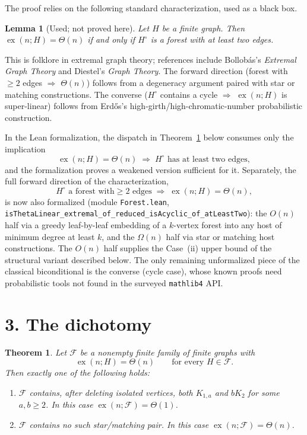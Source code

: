 \documentclass[11pt]{article}
\newtheorem{lemma}{Lemma}
\newtheorem{theorem}{Theorem}
\newcommand{\ex}{\operatorname{ex}}
\begin{document}
The proof relies on the following standard characterization, used as a
black box.

\begin{lemma}[Used; not proved here]
Let \(H\) be a finite graph. Then \(\ex(n;H)=\Theta(n)\) if and only if
\(H^\circ\) is a forest with at least two edges.
\end{lemma}

This is folklore in extremal graph theory; references include
Bollob\'as's \emph{Extremal Graph Theory} and Diestel's \emph{Graph
Theory}. The forward direction (forest with \(\ge 2\) edges \(\Rightarrow\)
\(\Theta(n)\)) follows from a degeneracy argument paired with star or
matching constructions. The converse (\(H^\circ\) contains a cycle
\(\Rightarrow\) \(\ex(n;H)\) is super-linear) follows from
Erd\H{o}s's high-girth/high-chromatic-number probabilistic construction.

In the Lean formalization, the dispatch in Theorem~\ref{thm:main} below
consumes only the implication
\[
\ex(n;H)=\Theta(n) \;\Longrightarrow\; H^\circ \text{ has at least two edges},
\]
and the formalization proves a weakened version sufficient for it.
Separately, the full forward direction of the characterization,
\[
H^\circ \text{ a forest with} \ge 2 \text{ edges}
  \;\Longrightarrow\; \ex(n;H)=\Theta(n),
\]
is now also formalized (module \texttt{Forest.lean},
\verb|isThetaLinear_extremal_of_reduced_isAcyclic_of_atLeastTwo|): the
\(O(n)\) half via a greedy leaf-by-leaf embedding of a $k$-vertex
forest into any host of minimum degree at least $k$, and the
\(\Omega(n)\) half via star or matching host constructions. The
\(O(n)\) half supplies the Case~(ii) upper bound of the structural
variant described below. The only remaining unformalized piece of the
classical biconditional is the converse (cycle case), whose known
proofs need probabilistic tools not found in the surveyed
\texttt{mathlib4} API.

\section*{3. The dichotomy}

\begin{theorem}\label{thm:main}
Let \(\mathcal F\) be a nonempty finite family of finite graphs with
\[
\ex(n;H)=\Theta(n) \qquad \text{for every } H\in\mathcal F.
\]
Then exactly one of the following holds:

\begin{enumerate}
\item[\textup{(i)}] \(\mathcal F\) contains, after deleting isolated vertices,
both \(K_{1,a}\) and \(bK_2\) for some \(a,b\ge 2\). In this case
\(\ex(n;\mathcal F)=\Theta(1)\).

\item[\textup{(ii)}] \(\mathcal F\) contains no such star/matching pair. In
this case \(\ex(n;\mathcal F)=\Theta(n)\).
\end{enumerate}
\end{theorem}
\end{document}
